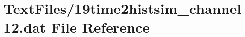 \hypertarget{19time2histsim__channel12_8dat}{}\section{Text\+Files/19time2histsim\+\_\+channel12.dat File Reference}
\label{19time2histsim__channel12_8dat}
